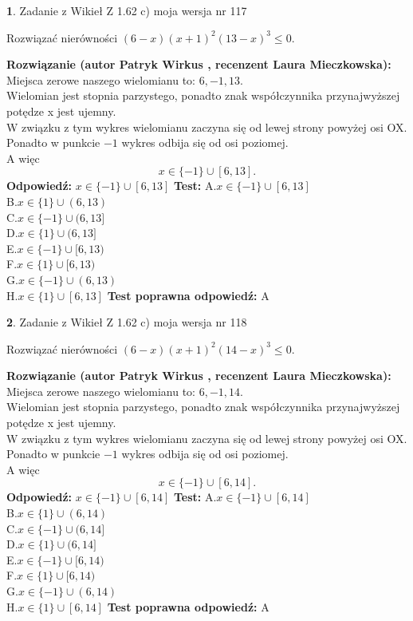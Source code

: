 \documentclass[12pt, a4paper]{article}
\theoremstyle{definition} %
\newtheorem{zad}{}
\newcommand{\zadStart}[1]{\begin{zad}#1\newline}
\newcommand{\zadStop}{\end{zad}}
\newcommand{\rozwStart}[2]{\noindent \textbf{Rozwiązanie (autor #1 , recenzent #2): }\newline}
\newcommand{\rozwStop}{\newline}
\newcommand{\odpStart}{\noindent \textbf{Odpowiedź:}\newline}
\newcommand{\odpStop}{\newline}
\newcommand{\testStart}{\noindent \textbf{Test:}\newline}
\newcommand{\testStop}{\newline}
\newcommand{\kluczStart}{\noindent \textbf{Test poprawna odpowiedź:}\newline}
\newcommand{\kluczStop}{\newline}
\begin{document}
\zadStart{Zadanie z Wikieł Z 1.62 c) moja wersja nr 117}

Rozwiązać nierówności $(6-x)(x+1)^{2}(13-x)^{3}\le0$.
\zadStop
\rozwStart{Patryk Wirkus}{Laura Mieczkowska}
Miejsca zerowe naszego wielomianu to: $6, -1, 13$.\\
Wielomian jest stopnia parzystego, ponadto znak współczynnika przy\linebreak najwyższej potędze x jest ujemny.\\ W związku z tym wykres wielomianu zaczyna się od lewej strony powyżej osi OX.\\
Ponadto w punkcie $-1$ wykres odbija się od osi poziomej.\\
A więc $$x \in \{-1\} \cup [6,13].$$
\rozwStop
\odpStart
$x \in \{-1\} \cup [6,13]$
\odpStop
\testStart
A.$x \in \{-1\} \cup [6,13]$\\
B.$x \in \{1\} \cup (6,13)$\\
C.$x \in \{-1\} \cup (6,13]$\\
D.$x \in \{1\} \cup (6,13]$\\
E.$x \in \{-1\} \cup [6,13)$\\
F.$x \in \{1\} \cup [6,13)$\\
G.$x \in \{-1\} \cup (6,13)$\\
H.$x \in \{1\} \cup [6,13]$
\testStop
\kluczStart
A
\kluczStop



\zadStart{Zadanie z Wikieł Z 1.62 c) moja wersja nr 118}

Rozwiązać nierówności $(6-x)(x+1)^{2}(14-x)^{3}\le0$.
\zadStop
\rozwStart{Patryk Wirkus}{Laura Mieczkowska}
Miejsca zerowe naszego wielomianu to: $6, -1, 14$.\\
Wielomian jest stopnia parzystego, ponadto znak współczynnika przy\linebreak najwyższej potędze x jest ujemny.\\ W związku z tym wykres wielomianu zaczyna się od lewej strony powyżej osi OX.\\
Ponadto w punkcie $-1$ wykres odbija się od osi poziomej.\\
A więc $$x \in \{-1\} \cup [6,14].$$
\rozwStop
\odpStart
$x \in \{-1\} \cup [6,14]$
\odpStop
\testStart
A.$x \in \{-1\} \cup [6,14]$\\
B.$x \in \{1\} \cup (6,14)$\\
C.$x \in \{-1\} \cup (6,14]$\\
D.$x \in \{1\} \cup (6,14]$\\
E.$x \in \{-1\} \cup [6,14)$\\
F.$x \in \{1\} \cup [6,14)$\\
G.$x \in \{-1\} \cup (6,14)$\\
H.$x \in \{1\} \cup [6,14]$
\testStop
\kluczStart
A
\kluczStop
\end{document}
